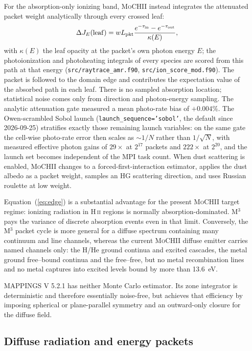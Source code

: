 \documentclass[english,a4paper]{my_memo}
\newcommand{\code}[1]{\texttt{#1}}
\newcommand{\MoCHII}{\textsc{MoCHII}}
\newcommand{\Mthree}{M$^3$}
\newcommand{\Mappings}{MAPPINGS V 5.2.1}
\begin{document}
For the absorption-only ionizing band, \MoCHII{} instead integrates the
attenuated packet weight analytically through every crossed leaf:
\begin{equation}
 \Delta J_E({\rm leaf}) = w L_{\rm pkt}
   \frac{e^{-\tau_{\rm in}}-e^{-\tau_{\rm out}}}{\kappa(E)} ,
 \label{eq:edge}
\end{equation}
with $\kappa(E)$ the leaf opacity at the packet's own photon energy $E$; the
photoionization and photoheating integrals of every species are scored from
this path at that energy (\code{src/raytrace\_amr.f90},
\code{src/ion\_score\_mod.f90}).
The packet is followed to the domain edge and contributes the expectation
value of the absorbed path in each leaf.  There is no sampled absorption
location; statistical noise comes only from direction and photon-energy
sampling.  The analytic attenuation gate measured a mean photo-rate bias of
$+0.004\%$.  The Owen-scrambled Sobol launch (\code{launch\_sequence='sobol'},
the default since 2026-09-25) stratifies exactly those remaining
launch variables: on the same gate the cell-wise photo-rate error then
scales as $\sim 1/N$ rather than $1/\sqrt{N}$, with measured effective
photon gains of $29\times$ at $2^{17}$ packets and $222\times$ at
$2^{20}$, and the launch set becomes independent of the MPI task count.  When dust scattering is enabled, \MoCHII{} changes to a
forced-first-interaction estimator, applies the dust albedo as a packet
weight, samples an HG scattering direction, and uses Russian roulette at
low weight.

Equation~(\ref{eq:edge}) is a substantial advantage for the present
\MoCHII{} target regime: ionizing radiation in H\,\textsc{ii} regions is
normally absorption-dominated.  \Mthree{} pays the variance of discrete
absorption events even in that limit.  Conversely, the \Mthree{} packet
cycle is more general for a diffuse spectrum containing many continuum and
line channels, whereas the current \MoCHII{} diffuse emitter carries named
channels only: the H/He ground continua and excited cascades, the metal
ground free--bound continua and the free--free, but no metal recombination
lines and no metal captures into excited levels bound by more than
13.6~eV.

\Mappings{} has neither Monte Carlo estimator.  Its zone integrator is
deterministic and therefore essentially noise-free, but achieves that
efficiency by imposing spherical or plane-parallel symmetry and an
outward-only closure for the diffuse field.

\subsection{Diffuse radiation and energy packets}
\end{document}
